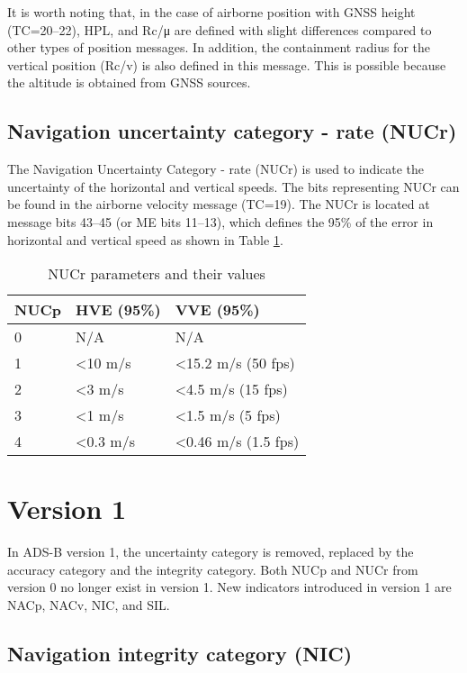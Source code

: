 It is worth noting that, in the case of airborne position with GNSS height (TC=20--22), HPL, and Rc/μ are defined with slight differences compared to other types of position messages. In addition, the containment radius for the vertical position (Rc/v) is also defined in this message. This is possible because the altitude is obtained from GNSS sources.


\subsection{Navigation uncertainty category - rate (NUCr)}

The Navigation Uncertainty Category - rate (NUCr) is used to indicate the uncertainty of the horizontal and vertical speeds. The bits representing NUCr can be found in the airborne velocity message (TC=19). The NUCr is located at message bits 43--45 (or ME bits 11--13), which defines the 95\% of the error in horizontal and vertical speed as shown in Table \ref{tb:nucr-params}.

\begin{table}[ht]
\caption{NUCr parameters and their values}
\label{tb:nucr-params}
\begin{tabular}{|l|l|l|}
\hline
\textbf{NUCp} & \textbf{HVE (95\%)} & \textbf{VVE (95\%)} \\ \hline
0 & N/A & N/A \\ \hline
1 & \textless 10 m/s & \textless 15.2 m/s (50 fps) \\ \hline
2 & \textless 3 m/s & \textless 4.5 m/s (15 fps) \\ \hline
3 & \textless 1 m/s & \textless 1.5 m/s (5 fps) \\ \hline
4 & \textless 0.3 m/s & \textless 0.46 m/s (1.5 fps) \\ \hline
\end{tabular}
\end{table}



\section{Version 1}


In ADS-B version 1, the uncertainty category is removed, replaced by the accuracy category and the integrity category. Both NUCp and NUCr from version 0 no longer exist in version 1. New indicators introduced in version 1 are NACp, NACv, NIC, and SIL.


\subsection{Navigation integrity category (NIC)}

